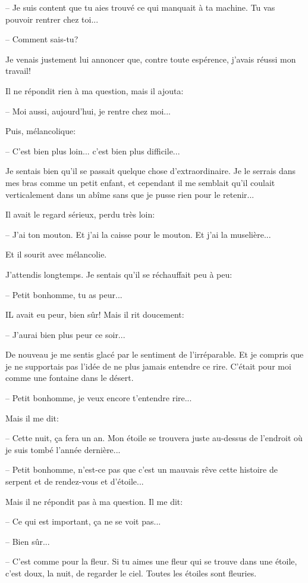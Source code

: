 \documentclass[a4paper]{report}
\begin{document}
-- Je suis content que tu aies trouvé ce qui manquait à ta machine. Tu vas pouvoir rentrer chez toi...

-- Comment sais-tu?

Je venais justement lui annoncer que, contre toute espérence, j'avais réussi mon travail!

Il ne répondit rien à ma question, mais il ajouta:

-- Moi aussi, aujourd'hui, je rentre chez moi...

Puis, mélancolique:

-- C'est bien plus loin... c'est bien plus difficile...

Je sentais bien qu'il se passait quelque chose d'extraordinaire. Je le serrais dans mes bras comme un petit enfant, et cependant il me semblait qu'il coulait verticalement dans un abîme sans que je pusse rien pour le retenir...

Il avait le regard sérieux, perdu très loin:

-- J'ai ton mouton. Et j'ai la caisse pour le mouton. Et j'ai la muselière...

Et il sourit avec mélancolie.

J'attendis longtemps. Je sentais qu'il se réchauffait peu à peu:

-- Petit bonhomme, tu as peur...

IL avait eu peur, bien sûr! Mais il rit doucement:

-- J'aurai bien plus peur ce soir...

De nouveau je me sentis glacé par le sentiment de l'irréparable. Et je compris que je ne supportais pas l'idée de ne plus jamais entendre ce rire. C'était pour moi comme une fontaine dans le désert.

-- Petit bonhomme, je veux encore t'entendre rire...

Mais il me dit:

-- Cette nuit, ça fera un an. Mon étoile se trouvera juste au-dessus de l'endroit où je suis tombé l'année dernière...

-- Petit bonhomme, n'est-ce pas que c'est un mauvais rêve cette histoire de serpent et de rendez-vous et d'étoile...

Mais il ne répondit pas à ma question. Il me dit:

-- Ce qui est important, ça ne se voit pas...

-- Bien sûr...

-- C'est comme pour la fleur. Si tu aimes une fleur qui se trouve dans une étoile, c'est doux, la nuit, de regarder le ciel. Toutes les étoiles sont fleuries.
\end{document}
